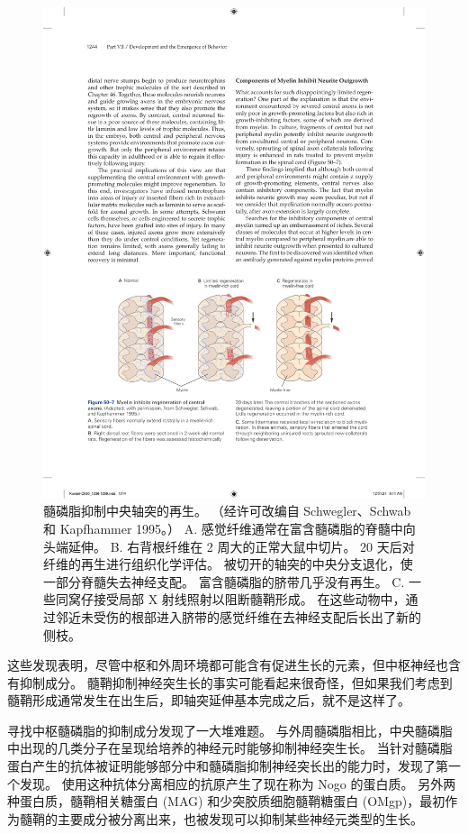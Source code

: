 \begin{figure}[htbp]
	\centering
	\includegraphics[width=0.8\linewidth]{chap50/fig_50_7}
	\caption{髓磷脂抑制中央轴突的再生。 （经许可改编自 Schwegler、Schwab 和 Kapfhammer 1995。） A. 感觉纤维通常在富含髓磷脂的脊髓中向头端延伸。 B. 右背根纤维在 2 周大的正常大鼠中切片。 20 天后对纤维的再生进行组织化学评估。 被切开的轴突的中央分支退化，使一部分脊髓失去神经支配。 富含髓磷脂的脐带几乎没有再生。 C. 一些同窝仔接受局部 X 射线照射以阻断髓鞘形成。 在这些动物中，通过邻近未受伤的根部进入脐带的感觉纤维在去神经支配后长出了新的侧枝。}
	\label{fig:50_7}
\end{figure}

这些发现表明，尽管中枢和外周环境都可能含有促进生长的元素，但中枢神经也含有抑制成分。 髓鞘抑制神经突生长的事实可能看起来很奇怪，但如果我们考虑到髓鞘形成通常发生在出生后，即轴突延伸基本完成之后，就不是这样了。

寻找中枢髓磷脂的抑制成分发现了一大堆难题。 与外周髓磷脂相比，中央髓磷脂中出现的几类分子在呈现给培养的神经元时能够抑制神经突生长。 当针对髓磷脂蛋白产生的抗体被证明能够部分中和髓磷脂抑制神经突长出的能力时，发现了第一个发现。 使用这种抗体分离相应的抗原产生了现在称为 Nogo 的蛋白质。 另外两种蛋白质，髓鞘相关糖蛋白 (MAG) 和少突胶质细胞髓鞘糖蛋白 (OMgp)，最初作为髓鞘的主要成分被分离出来，也被发现可以抑制某些神经元类型的生长。

